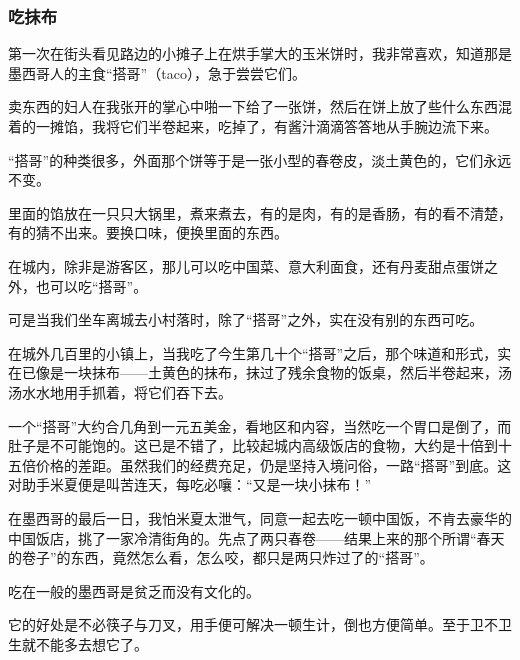 \subsubsection*{吃抹布}
\par 第一次在街头看见路边的小摊子上在烘手掌大的玉米饼时，我非常喜欢，知道那是墨西哥人的主食“搭哥”（taco），急于尝尝它们。
\par 卖东西的妇人在我张开的掌心中啪一下给了一张饼，然后在饼上放了些什么东西混着的一摊馅，我将它们半卷起来，吃掉了，有酱汁滴滴答答地从手腕边流下来。
\par “搭哥”的种类很多，外面那个饼等于是一张小型的春卷皮，淡土黄色的，它们永远不变。
\par 里面的馅放在一只只大锅里，煮来煮去，有的是肉，有的是香肠，有的看不清楚，有的猜不出来。要换口味，便换里面的东西。
\par 在城内，除非是游客区，那儿可以吃中国菜、意大利面食，还有丹麦甜点蛋饼之外，也可以吃“搭哥”。
\par 可是当我们坐车离城去小村落时，除了“搭哥”之外，实在没有别的东西可吃。
\par 在城外几百里的小镇上，当我吃了今生第几十个“搭哥”之后，那个味道和形式，实在已像是一块抹布——土黄色的抹布，抹过了残余食物的饭桌，然后半卷起来，汤汤水水地用手抓着，将它们吞下去。
\par 一个“搭哥”大约合几角到一元五美金，看地区和内容，当然吃一个胃口是倒了，而肚子是不可能饱的。这已是不错了，比较起城内高级饭店的食物，大约是十倍到十五倍价格的差距。虽然我们的经费充足，仍是坚持入境问俗，一路“搭哥”到底。这对助手米夏便是叫苦连天，每吃必嚷：“又是一块小抹布！”
\par 在墨西哥的最后一日，我怕米夏太泄气，同意一起去吃一顿中国饭，不肯去豪华的中国饭店，挑了一家冷清街角的。先点了两只春卷——结果上来的那个所谓“春天的卷子”的东西，竟然怎么看，怎么咬，都只是两只炸过了的“搭哥”。
\par 吃在一般的墨西哥是贫乏而没有文化的。
\par 它的好处是不必筷子与刀叉，用手便可解决一顿生计，倒也方便简单。至于卫不卫生就不能多去想它了。


